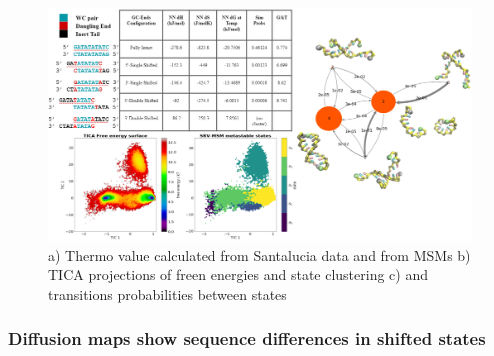 \documentclass[journal=jpcbfk,manuscript=article]{achemso}
\begin{document}
\begin{figure}[ht!]
	\begin{center}
        \includegraphics[width=\textwidth]{Figs/figs_0804/GC-end_in_one.PNG}
        \caption{a) Thermo value calculated from Santalucia data and from MSMs b) TICA projections of freen energies and state clustering c) and transitions probabilities between states}
        \label{fig:GC-end_in_one}
	\end{center}
\end{figure}

\subsubsection{\label{sec:Results}Diffusion maps show sequence differences in shifted states}
\end{document}
